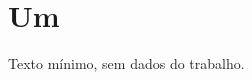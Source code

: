 \documentclass{abntex2-ufv}
\begin{document}
\textual
\chapter{Um}
Texto mínimo, sem dados do trabalho.
\end{document}
